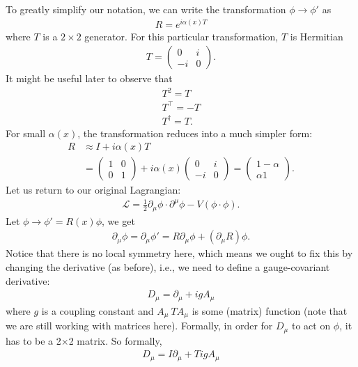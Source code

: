 \documentclass{book}
\numberwithin{equation}{section}
\theoremstyle{definition}
\newcommand{\p}{\partial}
\newcommand{\lag}{\mathcal{L}}
\begin{document}
To greatly simplify our notation, we can write the transformation $\phi \to \phi'$ as
\begin{align}
R = e^{i\alpha(x)T}
\end{align}
where $T$ is a $2\times 2$ generator. For this particular transformation, $T$ is Hermitian 
\begin{align}
T = \begin{pmatrix}
0 & i\\
-i & 0
\end{pmatrix}.
\end{align}
It might be useful later to observe that
\begin{align}
T^2 = T\\T^\top = -T \\ T^{\dagger} = T.
\end{align}
For small $\alpha(x)$, the transformation reduces into a much simpler form:
\begin{align}
R &\approx I + i\alpha(x)T\\
&= \begin{pmatrix}
1&0\\0&1
\end{pmatrix} + i\alpha(x)\begin{pmatrix}
0 & i\\-i&0
\end{pmatrix} = 
\begin{pmatrix}
1 -\alpha\\\alpha 1
\end{pmatrix}.
\end{align}
Let us return to our original Lagrangian:
\begin{align}
\lag = \frac{1}{2}\p_\mu\phi \cdot \p^\mu\phi - V(\phi\cdot \phi).
\end{align}
Let $\phi \to \phi' = R(x)\phi$, we get 
\begin{align}
\p_\mu\phi = \p_\mu\phi' = R\p_\mu\phi + (\p_\mu R)\phi.
\end{align}
Notice that there is no local symmetry here, which means we ought to fix this by changing the derivative (as before), i.e., we need to define a gauge-covariant derivative:
\begin{align}
D_\mu = \p_\mu + igA_\mu
\end{align}
where $g$ is a coupling constant and $A_\mu ~ TA_\mu$ is some (matrix) function (note that we are still working with matrices here). Formally, in order for $D_\mu$ to act on $\phi$, it has to be a 2$\times $2 matrix. So formally,
\begin{align}
\boxed{D_\mu = I\p_\mu + TigA_\mu}
\end{align} 
\end{document}
